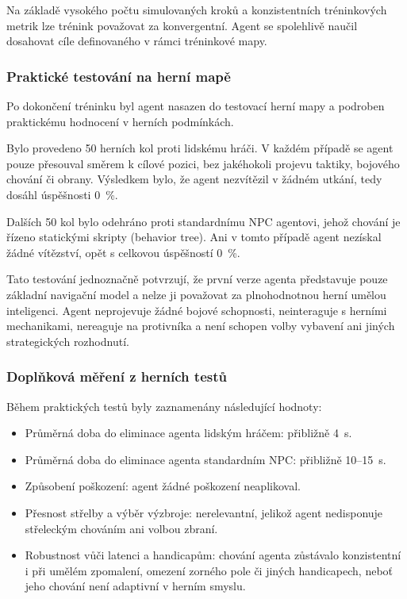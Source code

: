 Na základě vysokého počtu simulovaných kroků a konzistentních tréninkových metrik lze trénink považovat za konvergentní. Agent se spolehlivě naučil dosahovat cíle definovaného v rámci tréninkové mapy.

\subsubsection{Praktické testování na herní mapě}

Po dokončení tréninku byl agent nasazen do testovací herní mapy a podroben praktickému hodnocení v herních podmínkách.

Bylo provedeno 50 herních kol proti lidskému hráči. V každém případě se agent pouze přesouval směrem k cílové pozici, bez jakéhokoli projevu taktiky, bojového chování či obrany. Výsledkem bylo, že agent nezvítězil v žádném utkání, tedy dosáhl úspěšnosti 0~\%.

Dalších 50 kol bylo odehráno proti standardnímu NPC agentovi, jehož chování je řízeno statickými skripty (behavior tree). Ani v tomto případě agent nezískal žádné vítězství, opět s celkovou úspěšností 0~\%.

Tato testování jednoznačně potvrzují, že první verze agenta představuje pouze základní navigační model a nelze ji považovat za plnohodnotnou herní umělou inteligenci. Agent neprojevuje žádné bojové schopnosti, neinteraguje s herními mechanikami, nereaguje na protivníka a není schopen volby vybavení ani jiných strategických rozhodnutí.

\subsubsection{Doplňková měření z herních testů}

Během praktických testů byly zaznamenány následující hodnoty:

\begin{itemize}
    \item Průměrná doba do eliminace agenta lidským hráčem: přibližně 4~s.
    \item Průměrná doba do eliminace agenta standardním NPC: přibližně 10--15~s.
    \item Způsobení poškození: agent žádné poškození neaplikoval.
    \item Přesnost střelby a výběr výzbroje: nerelevantní, jelikož agent nedisponuje střeleckým chováním ani volbou zbraní.
    \item Robustnost vůči latenci a handicapům: chování agenta zůstávalo konzistentní i při umělém zpomalení, omezení zorného pole či jiných handicapech, neboť jeho chování není adaptivní v herním smyslu.
\end{itemize}

